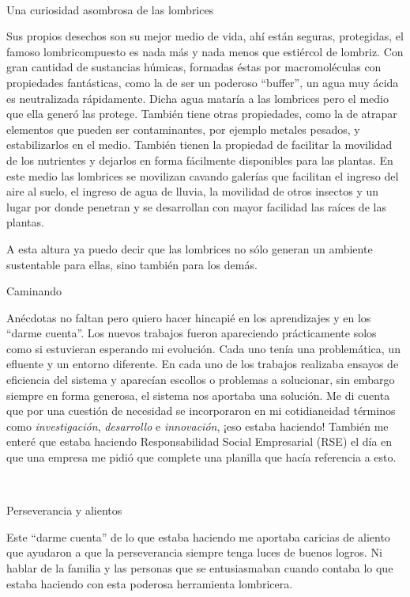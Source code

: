 \begin{fullwidth}
~

Una curiosidad asombrosa de las lombrices

Sus propios desechos son su mejor medio de vida, ahí están seguras,
protegidas, el famoso lombricompuesto es nada más y nada menos que
estiércol de lombriz. Con gran cantidad de sustancias húmicas, formadas
éstas por macromoléculas con propiedades fantásticas, como la de ser un
poderoso ``buffer'', un agua muy ácida es neutralizada rápidamente.
Dicha agua mataría a las lombrices pero el medio que ella generó las
protege. También tiene otras propiedades, como la de atrapar elementos
que pueden ser contaminantes, por ejemplo metales pesados, y
estabilizarlos en el medio. También tienen la propiedad de facilitar la
movilidad de los nutrientes y dejarlos en forma fácilmente disponibles
para las plantas. En este medio las lombrices se movilizan cavando
galerías que facilitan el ingreso del aire al suelo, el ingreso de agua
de lluvia, la movilidad de otros insectos y un lugar por donde penetran
y se desarrollan con mayor facilidad las raíces de las plantas.

A esta altura ya puedo decir que las lombrices no sólo generan un
ambiente sustentable para ellas, sino también para los demás.

Caminando

Anécdotas no faltan pero quiero hacer hincapié en los aprendizajes y en
los ``darme cuenta''. Los nuevos trabajos fueron apareciendo
prácticamente solos como si estuvieran esperando mi evolución. Cada uno
tenía una problemática, un efluente y un entorno diferente. En cada uno
de los trabajos realizaba ensayos de eficiencia del sistema y aparecían
escollos o problemas a solucionar, sin embargo siempre en forma
generosa, el sistema nos aportaba una solución. Me di cuenta que por una
cuestión de necesidad se incorporaron en mi cotidianeidad términos como
\emph{investigación}, \emph{desarrollo} e \emph{innovación}, ¡eso estaba
haciendo! También me enteré que estaba haciendo Responsabilidad Social
Empresarial (RSE) el día en que una empresa me pidió que complete una
planilla que hacía referencia a esto.

~

Perseverancia y alientos

Este ``darme cuenta'' de lo que estaba haciendo me aportaba caricias de
aliento que ayudaron a que la perseverancia siempre tenga luces de
buenos logros. Ni hablar de la familia y las personas que se
entusiasmaban cuando contaba lo que estaba haciendo con esta poderosa
herramienta lombricera.


\end{fullwidth}
